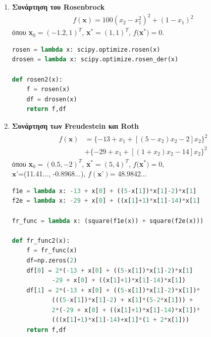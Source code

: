 \documentclass[a4paper,12pt,twoside]{report}
\theoremstyle{plain}
\theoremstyle{definition}
\theoremstyle{remark}
\begin{document}
\begin{enumerate}
\item \textbf{Συνάρτηση του Rosenbrock}
\begin{align}
f(\textbf{x}) = 100(x_2-x_1^2)^2+(1-x_1)^2
\end{align}
όπου  \textbf{x}$_0 = (-1.2,1)^T$,\hspace{0.1cm} \textbf{x}$^*=(1, 1)^T$, \hspace{0.1cm} $f($\textbf{x}$^*)=0$.
\begin{lstlisting}[extendedchars=true,caption="Η συνάρτηση Rosenbrock σε κώδικα Python",language=python]
rosen = lambda x: scipy.optimize.rosen(x)
drosen = lambda x: scipy.optimize.rosen_der(x)

def rosen2(x):
    f = rosen(x)
    df = drosen(x)
    return f,df
\end{lstlisting}
\item \textbf{Συνάρτηση των Freudestein και Roth}
\begin{align}
\begin{split}
f(\textbf{x}) &= \{-13+x_1+[(5-x_2)x_2-2]x_2\}^2\\
&+\{-29+x_1+[(1+x_2)x_2-14]x_2\}^2
\end{split}
\end{align}
όπου  \textbf{x}$_0 = (0.5,-2)^T$,\hspace{0.1cm} \textbf{x}$^*=(5, 4)^T$, \hspace{0.1cm} $f($\textbf{x}$^*)=0$, \\
\hspace{0.1cm} $\textbf{x'}$=(11.41..., -0.8968...), \hspace{0.1cm}$f(\textbf{x'})$= 48.9842...
\begin{lstlisting}[extendedchars=true,caption="Η συνάρτηση των Freudestein και Roth σε κώδικα Python",language=python]
f1e = lambda x: -13 + x[0] + ((5-x[1])*x[1]-2)*x[1]
f2e = lambda x: -29 + x[0] + ((x[1]+1)*x[1]-14)*x[1]

fr_func = lambda x: (square(f1e(x)) + square(f2e(x)))

def fr_func2(x):
    f = fr_func(x)
    df=np.zeros(2)
    df[0] = 2*(-13 + x[0] + ((5-x[1])*x[1]-2)*x[1] 
    	   -29 + x[0] + ((x[1]+1)*x[1]-14)*x[1])
    df[1] = 2*(-13 + x[0] + ((5-x[1])*x[1]-2)*x[1])*
    	   (((5-x[1])*x[1]-2) + x[1]*(5-2*x[1])) + 
           2*(-29 + x[0] + ((x[1]+1)*x[1]-14)*x[1])*
           (((x[1]+1)*x[1]-14)+x[1]*(1 + 2*x[1]))
    return f,df

\end{lstlisting}
\end{enumerate}
    
\end{document}

